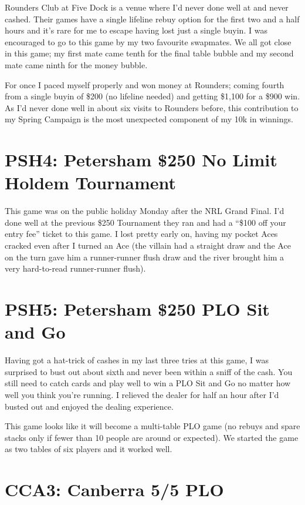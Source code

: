 Rounders Club at Five Dock is a venue where I'd never done well at and
never cashed. Their games have a single lifeline rebuy option for the
first two and a half hours and it's rare for me to escape having lost
just a single buyin. I was encouraged to go to this game by my two
favourite swapmates. We all got close in this game; my first mate came
tenth for the final table bubble and my second mate came ninth for the
money bubble.

For once I paced myself properly and won money at Rounders; coming
fourth from a single buyin of \$200 (no lifeline needed) and getting
\$1,100 for a \$900 win. As I'd never done well
in about six visits to Rounders before, this contribution to my Spring
Campaign is the most unexpected component of my 10k in winnings.

\section*{PSH4: Petersham \$250 No Limit Holdem Tournament}

This game was on the public holiday Monday after the NRL Grand
Final. I'd done well at the previous \$250 Tournament they ran and had
a ``\$100 off your entry fee'' ticket to this game. I lost pretty
early on, having my pocket Aces cracked even after I turned an Ace
(the villain had a straight draw and the Ace on the turn gave him a
runner-runner flush draw and the river brought him a very hard-to-read
runner-runner flush).

\section*{PSH5: Petersham \$250 PLO Sit and Go}

Having got a hat-trick of cashes in my last three tries at this game,
I was surprised to bust out about sixth and never been within a sniff
of the cash. You still need to catch cards and play well to win a PLO
Sit and Go no matter how well you think you're running. I relieved the
dealer for half an hour after I'd busted out and enjoyed the dealing
experience.

This game looks like it will become a multi-table PLO game (no rebuys
and spare stacks only if fewer than 10 people are around or
expected). We started the game as two tables of six players and it
worked well.

\section*{CCA3: Canberra 5/5 PLO}

